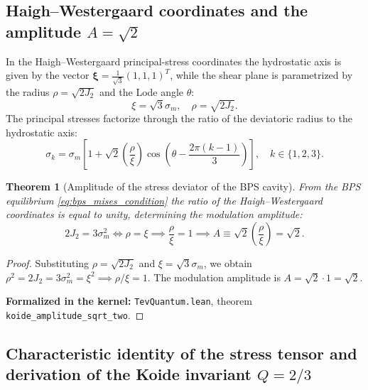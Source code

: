 \documentclass[11pt,a4paper]{article}
\newtheorem{theorem}{Theorem}
\theoremstyle{definition}
\theoremstyle{remark}
\begin{document}
\subsection{Haigh--Westergaard coordinates and the amplitude $A = \sqrt{2}$}

In the Haigh--Westergaard principal-stress coordinates the hydrostatic axis is given by the vector $\boldsymbol{\xi} = \frac{1}{\sqrt{3}}(1, 1, 1)^T$, while the shear plane is parametrized by the radius $\rho = \sqrt{2J_2}$ and the Lode angle $\theta$:
\begin{equation}
    \xi = \sqrt{3}\sigma_m, \quad \rho = \sqrt{2J_2}.
    \label{eq:haigh_westergaard_coords}
\end{equation}
The principal stresses factorize through the ratio of the deviatoric radius to the hydrostatic axis:
\begin{equation}
    \sigma_k = \sigma_m \left[ 1 + \sqrt{2} \left(\frac{\rho}{\xi}\right) \cos\left(\theta - \frac{2\pi(k-1)}{3}\right) \right], \quad k \in \{1, 2, 3\}.
    \label{eq:principal_stresses_factored}
\end{equation}

\begin{theorem}[Amplitude of the stress deviator of the BPS cavity]
\label{thm:deviator_amplitude_sqrt2}
From the BPS equilibrium \eqref{eq:bps_mises_condition} the ratio of the Haigh--Westergaard coordinates is equal to unity, determining the modulation amplitude:
\begin{equation}
    2J_2 = 3\sigma_m^2 \iff \rho = \xi \implies \frac{\rho}{\xi} = 1 \implies A \equiv \sqrt{2}\left(\frac{\rho}{\xi}\right) = \sqrt{2}.
    \label{eq:deviator_amplitude_exact}
\end{equation}
\end{theorem}
\begin{proof}
Substituting $\rho = \sqrt{2J_2}$ and $\xi = \sqrt{3}\sigma_m$, we obtain $\rho^2 = 2J_2 = 3\sigma_m^2 = \xi^2 \implies \rho/\xi = 1$. The modulation amplitude is $A = \sqrt{2} \cdot 1 = \sqrt{2}$.

\noindent\small\textbf{Formalized in the kernel:} \texttt{TevQuantum.lean}, theorem \texttt{koide_amplitude_sqrt_two}.
\end{proof}

\subsection{Characteristic identity of the stress tensor and derivation of the Koide invariant $Q = 2/3$}
\end{document}
